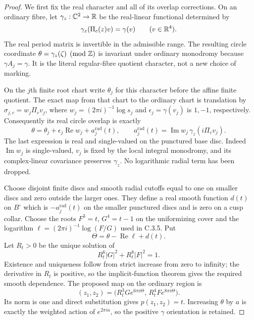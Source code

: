 \begin{proof}
We first fix the real character and all of its overlap corrections.
On an ordinary fibre, let
$\gamma_z:\mathbb C^2\to\mathbb R$ be the real-linear functional determined by
\[
 \gamma_z(\Pi_c(z)v)=\gamma(v)\qquad(v\in\mathbb R^4).
\]
The real period matrix is invertible in the admissible range.
The resulting circle coordinate
$\theta=\gamma_z(\zeta)\pmod{\mathbb Z}$ is invariant under ordinary
monodromy because $\gamma A_j=\gamma$. It is the literal
regular-fibre quotient character, not a new choice of marking.

On the $j$th finite root chart write $\theta_j$ for this
character before the affine finite quotient. The exact map from
that chart to the ordinary chart is translation by
$\sigma_{j,c}=w_j\Pi_cv_j$, where
$w_j=(2\pi i)^{-1}\log s_j$ and
$\epsilon_j=\gamma(v_j)$ is $1,-1$, respectively.
Consequently its real circle overlap is exactly
\begin{equation}\label{eq:C13-real-overlap}
 \theta=\theta_j+\epsilon_j\operatorname{Re}w_j+a_j^{\mathrm{rad}}(t),
 \qquad
 a_j^{\mathrm{rad}}(t)=\operatorname{Im}w_j\,
                  \gamma_z(i\Pi_cv_j).
\end{equation}
The last expression is real and single-valued on the punctured
base disc. Indeed $\operatorname{Im}w_j$ is single-valued,
$v_j$ is fixed by the local integral monodromy, and its
complex-linear covariance preserves $\gamma_z$.
No logarithmic radial term has been dropped.

Choose disjoint finite discs and smooth radial cutoffs equal to
one on smaller discs and zero outside the larger ones. They define
a real smooth function $d(t)$ on $B^\circ$ which is $-a_j^{\mathrm{rad}}(t)$
on the smaller punctured discs and is zero on a cusp collar.
Choose the roots $F^3=t$, $G^4=t-1$ on the uniformizing cover and
the logarithm $\ell=(2\pi i)^{-1}\log(F/G)$ used in C.3.5.
Put
\[
 \Theta=\theta-\operatorname{Re}\ell+d(t).
\]
Let $R_t>0$ be the unique solution of
\[
 R_t^6|G|^2+R_t^8|F|^2=1.
\]
Existence and uniqueness follow from strict increase from zero
to infinity; the derivative in $R_t$ is positive, so the
implicit-function theorem gives the required smooth dependence.
The proposed map on the ordinary region is
\begin{equation}\label{eq:C13-weighted-map}
 (z_1,z_2)=
 \bigl(R_t^3G e^{6\pi i\Theta},\,
                R_t^4F e^{8\pi i\Theta}\bigr).
\end{equation}
Its norm is one and direct substitution gives $p(z_1,z_2)=t$.
Increasing $\theta$ by $a$ is exactly the weighted action of
$e^{2\pi ia}$, so the positive $\gamma$ orientation is retained.


\end{proof}
